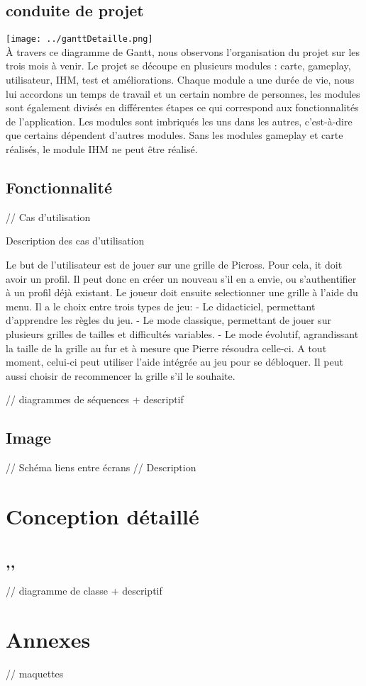 \documentclass{report}
\begin{document}
    \section{conduite de projet}
    \texttt{[image: ../ganttDetaille.png]}
    \\
     À travers ce diagramme de Gantt, nous observons l'organisation du projet sur les trois mois à venir. Le projet se découpe en plusieurs modules : carte, gameplay, utilisateur, IHM, test et améliorations.
    Chaque module a une durée de vie, nous lui accordons un temps de travail et un certain nombre de personnes, les modules sont également divisés en différentes étapes ce qui correspond aux fonctionnalités de l'application. Les modules sont imbriqués les uns dans les autres, c'est-à-dire que certains dépendent d'autres modules. Sans les modules gameplay et carte réalisés, le module IHM ne peut être réalisé. 
    
    \section{Fonctionnalité}
      // Cas d'utilisation 
      
      Description des cas d'utilisation

	Le but de l'utilisateur est de jouer sur une grille de Picross.
Pour cela, it doit avoir un profil. Il peut donc en créer un nouveau s'il en a envie, ou s'authentifier à un profil déjà existant.
	Le joueur doit ensuite selectionner une grille à l'aide du menu. Il a le choix entre trois types de jeu:
	- Le didacticiel, permettant d'apprendre les règles du jeu. 
	- Le mode classique, permettant de jouer sur plusieurs grilles de tailles et difficultés variables.
	- Le mode évolutif, agrandissant la taille de la grille au fur et à mesure que Pierre résoudra celle-ci.
	A tout moment, celui-ci peut utiliser l'aide intégrée au jeu pour se débloquer. Il peut aussi choisir de recommencer la grille s'il le souhaite.

      // diagrammes de séquences + descriptif 
    
		\section{Image}
			// Schéma liens entre écrans
			// Description
			
\chapter{Conception détaillé}

    \section{ ,, }
      // diagramme de classe + descriptif

    
\chapter{Annexes}

      // maquettes
\end{document}
